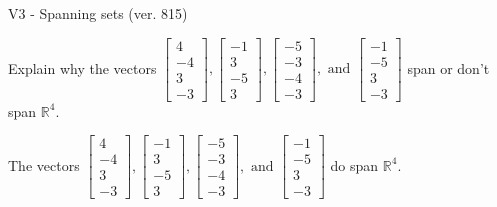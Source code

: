 \begin{exercise}
  \begin{exerciseTitle}V3 - Spanning sets (ver. 815)\end{exerciseTitle}
  \begin{exerciseStatement}
    Explain why the vectors \(\left[\begin{array}{r}
4 \\
-4 \\
3 \\
-3
\end{array}\right] , \left[\begin{array}{r}
-1 \\
3 \\
-5 \\
3
\end{array}\right] , \left[\begin{array}{r}
-5 \\
-3 \\
-4 \\
-3
\end{array}\right] , \text{ and } \left[\begin{array}{r}
-1 \\
-5 \\
3 \\
-3
\end{array}\right]\) span or don't span \(\mathbb{R}^4\). 
	


  \end{exerciseStatement}
  \begin{exerciseAnswer}
   The vectors \(\left[\begin{array}{r}
4 \\
-4 \\
3 \\
-3
\end{array}\right] , \left[\begin{array}{r}
-1 \\
3 \\
-5 \\
3
\end{array}\right] , \left[\begin{array}{r}
-5 \\
-3 \\
-4 \\
-3
\end{array}\right] , \text{ and } \left[\begin{array}{r}
-1 \\
-5 \\
3 \\
-3
\end{array}\right]\) 
  	 do  
	span \(\mathbb{R}^4\).
  


  \end{exerciseAnswer}
\end{exercise}
